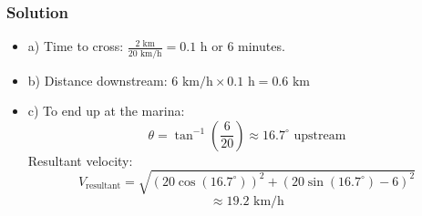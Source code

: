 \documentclass{article}
\begin{document}
\begin{multicols}{2}

\columnbreak

\subsubsection*{Solution}
\begin{itemize}
    \item a) Time to cross: \( \frac{2 \text{ km}}{20 \text{ km/h}} = 0.1 \text{ h} \) or 6 minutes.
    \item b) Distance downstream: \( 6 \text{ km/h} \times 0.1 \text{ h} = 0.6 \text{ km} \)
    \item c) To end up at the marina:
        \[
        \theta = \tan^{-1} \left( \frac{6}{20} \right) \approx 16.7^\circ \text{ upstream}
        \]
        Resultant velocity:
        \[
        V_{\text{resultant}} = \sqrt{(20 \cos(16.7^\circ))^2 + (20 \sin(16.7^\circ) - 6)^2} 
        \]
        \[
        \approx 19.2 \text{ km/h}
        \]
\end{itemize}

\end{multicols}
 
\end{document}
